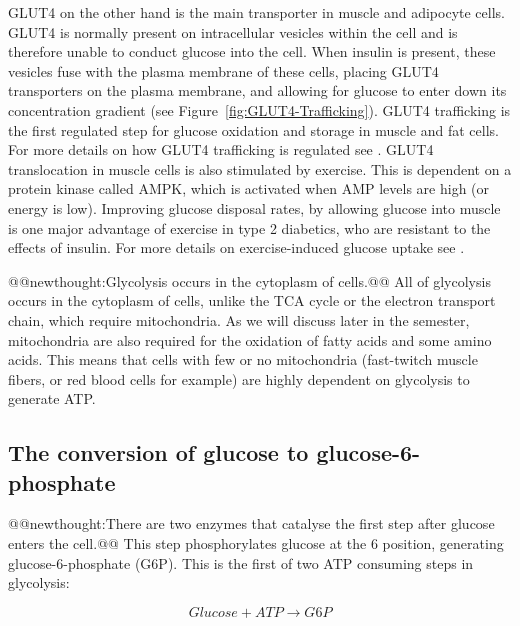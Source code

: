 \documentclass{tufte-handout}
\makeatletter
\def\newthought#1{@@newthought:#1@@}
\makeatother
\begin{document}
GLUT4 on the other hand is the main transporter in muscle and adipocyte cells.  GLUT4 is normally present on intracellular vesicles within the cell and is therefore unable to conduct glucose into the cell.  When insulin is present, these vesicles fuse with the plasma membrane of these cells, placing GLUT4 transporters on the plasma membrane, and allowing for glucose to enter down its concentration gradient (see Figure~\ref{fig:GLUT4-Trafficking}).  GLUT4 trafficking is the first regulated step for glucose oxidation and storage in muscle and fat cells.  For more details on how GLUT4 trafficking is regulated see \citet{Leto2013}.  GLUT4 translocation in muscle cells is also stimulated by exercise.  This is dependent on a protein kinase called AMPK, which is activated when AMP levels are high (or energy is low).  Improving glucose disposal rates, by allowing glucose into muscle is one major advantage of exercise in type 2 diabetics, who are resistant to the effects of insulin.  For more details on exercise-induced glucose uptake see \citet{Richter2013}.


\newthought{Glycolysis occurs in the cytoplasm of cells.}  All of glycolysis occurs in the cytoplasm of cells, unlike the TCA cycle or the electron transport chain, which require mitochondria.  As we will discuss later in the semester, mitochondria are also required for the oxidation of fatty acids and some amino acids.  This means that cells with few or no mitochondria (fast-twitch muscle fibers, or red blood cells for example) are highly dependent on glycolysis to generate ATP.

\subsection{The conversion of glucose to glucose-6-phosphate}

\newthought{There are two enzymes that catalyse the first step after glucose enters the cell.}   This step phosphorylates glucose at the 6 position, generating glucose-6-phosphate (G6P).  This is the first of two ATP consuming steps in glycolysis:

\begin{equation}\label{eq:glucokinase}
Glucose + ATP \rightarrow G6P
\end{equation}
\end{document}
